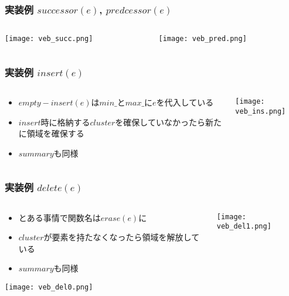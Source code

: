 \documentclass[dvipdfmx,12pt,notheorems]{beamer}
\theoremstyle{definition}
\begin{document}
\begin{frame}\frametitle{実装例\; $successor(e)$, $predcessor(e)$}
\begin{columns}[T]
\begin{column}{0.49\textwidth}
\texttt{[image: veb\_succ.png]}
\end{column}
\begin{column}{0.5\textwidth}
\texttt{[image: veb\_pred.png]}
\end{column}
\end{columns}
\end{frame}

\begin{frame}\frametitle{実装例\; $insert(e)$}
\begin{columns}
\begin{column}{0.39\textwidth}
\begin{itemize}
\item $empty-insert(e)$は$min\_$と$max\_$に$e$を代入している
\item $insert$時に格納する$cluster$を確保していなかったら新たに領域を確保する
\item $summary$も同様
\end{itemize}
\end{column}
\begin{column}{0.6\textwidth}
\texttt{[image: veb\_ins.png]}
\end{column}
\end{columns}
\end{frame}

\begin{frame}\frametitle{実装例\; $delete(e)$}
\begin{columns}
\begin{column}{0.49\textwidth}
\begin{itemize}
\item とある事情で関数名は$erase(e)$に
\item $cluster$が要素を持たなくなったら領域を解放している
\item $summary$も同様
\end{itemize}
\texttt{[image: veb\_del0.png]}
\end{column}
\begin{column}{0.5\textwidth}
\texttt{[image: veb\_del1.png]}
\end{column}
\end{columns}
\end{frame}
\end{document}
